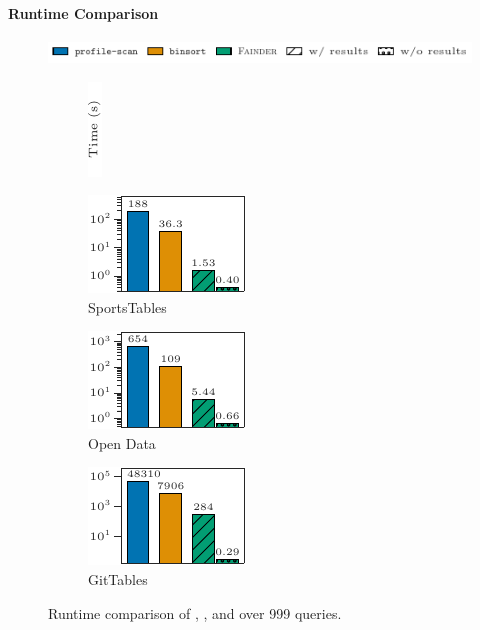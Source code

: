 \paragraph{Runtime Comparison}

\begin{figure}[t]
    \centering
    \includegraphics{figures/figure_10_legend.pdf}\\
    \begin{subfigure}[t]{.03\linewidth}
        \centering
        \includegraphics{figures/figure_10_label.pdf}
    \end{subfigure}%
    \hspace{-0.005\linewidth}%
    \begin{subfigure}[t]{.325\linewidth}
        \centering
        \includegraphics{figures/figure_10_a.pdf}
        \caption{SportsTables}
    \end{subfigure}%
    \begin{subfigure}[t]{.325\linewidth}
        \centering
        \includegraphics{figures/figure_10_b.pdf}
        \caption{Open Data}
    \end{subfigure}%
    \begin{subfigure}[t]{.325\linewidth}
        \centering
        \includegraphics{figures/figure_10_c.pdf}
        \caption{GitTables}
    \end{subfigure}%
    \caption{Runtime comparison of \pscan, \binsort, and \approximate{} over 999 queries.}
    \label{fig:runtime_comparison}
\end{figure}

